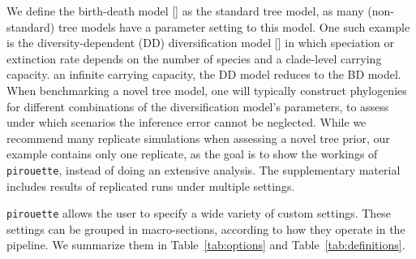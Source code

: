 We define the birth-death  model [\cite{nee1994reconstructed}] as
the standard tree model, as many (non-standard) tree models 
have a parameter setting  to this model. 
One such example is the diversity-dependent (DD) diversification 
model [\cite{DDD, etienne2012diversity}] in which speciation 
or extinction rate depends 
on the number of species and a clade-level carrying capacity.
an infinite carrying capacity, the DD model reduces to the BD model.
When benchmarking a novel tree model, 
one will typically construct phylogenies 
for different combinations of the diversification model's parameters, 
to assess under which scenarios the inference error cannot be neglected. 
While we recommend many replicate simulations 
when assessing a novel tree prior, 
our example contains only one replicate,
as the goal is to show the workings of \verb;pirouette;,
instead of doing an extensive analysis.
The supplementary material includes results of replicated runs under multiple settings.

\verb;pirouette; allows the user to specify a wide variety of custom settings. 
These settings can be grouped in macro-sections, 
according to how they operate in the pipeline. 
We summarize them in Table~\ref{tab:options} and Table~\ref{tab:definitions}.

